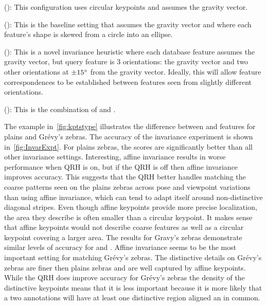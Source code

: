         \begin{itemln}

            \item \NoInvar{} (): %
                This configuration uses circular keypoints and assumes the gravity vector.

            \item \AIAlone{} (): %
                This is the baseline setting that assumes the gravity vector and where each feature's shape is skewed
                  from a circle into an ellipse.

            \item \QRHCirc{} (): %
                This is a novel invariance heuristic where each {database} feature assumes the gravity vector, but
                  {query} feature is $3$ orientations:
                the gravity vector and two other orientations at $\pm15^{\circ}$ from the gravity vector.
                Ideally, this will allow feature correspondences to be established between features seen from
                  slightly different orientations.

            \item \QRHEll{} (): %
                This is the combination of \QRHCirc{} and \AIAlone{}.

        \end{itemln}

        \InvarExpt{}

        The example in~\cref{fig:kptstype} illustrates the difference between \AIAlone{} and \QRHCirc{} features
          for plains and Grévy's zebras.
        The accuracy of the invariance experiment is shown in~\cref{fig:InvarExpt}.
        For plains zebras, the \QRHCirc{} scores are significantly better than all other invariance settings.
        Interesting, affine invariance results in worse performance when QRH is on, but if the QRH is off then
          affine invariance improves accuracy.
        This suggests that the QRH better handles matching the coarse patterns seen on the plains zebras across
          pose and viewpoint variations than using affine invariance, which can tend to adapt itself around
          non-distinctive diagonal stripes.
        Even though affine keypoints provide more precise localization, the area they describe is often smaller
          than a circular keypoint.
        It makes sense that affine keypoints would not describe coarse features as well as a circular keypoint
          covering a larger area.
        The results for Gravy's zebras demonstrate similar levels of accuracy for \AIAlone{} and \QRHEll{}.
        Affine invariance seems to be the most important setting for matching Grévy's zebras.
        The distinctive details on Grévy's zebras are finer then plains zebras and are well captured by affine
          keypoints.
        While the QRH does improve accuracy for Grévy's zebras the density of the distinctive keypoints means
          that it is less important because it is more likely that a two annotations will have at least one
          distinctive region aligned an in common.

